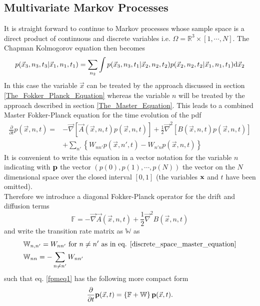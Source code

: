 \subsection{Multivariate Markov Processes}
\label{Multivariate_Markov_Processes}
It is straight forward to continue to Markov processes whose sample space is a direct product of continuous and discrete variables i.e. $\Omega = \mathbb{R}^{3} \times [1,\cdots, N]$. The Chapman Kolmogorov equation then becomes
\begin{equation}
    p(\vec{x}_3,n_3,t_3|\vec{x}_1,n_1,t_1) = \sum_{n_2} \int p(\vec{x}_3,n_3,t_1|\vec{x}_2,n_2,t_2)p(\vec{x}_2,n_2,t_2|\vec{x}_1,n_1,t_1) {\rm d} \vec{x}_2
    \label{MCK}
\end{equation}
In this case the variable $\vec{x}$ can be treated by the approach discussed in section \ref{The_Fokker_Planck_Equation} whereas the variable $n$ will be treated by the approach described in section \ref{The_Master_Equation}. This leads to a combined Master Fokker-Planck equation for the time evolution of the pdf
\begin{align}
    \frac{\partial}{\partial t } p(\vec{x},n,t) =   &- \vec{ \nabla } \left[\vec{A}(\vec{x},n,t)p(\vec{x},n,t) \right] + \frac{1}{2}\vec{\nabla}^{2}\left[ B(\vec{x},n,t)p(\vec{x},n,t) \right] \nonumber \\
                                                    &+ \sum_{n'} \left\{ W_{nn'}p(\vec{x},n',t) - W_{n'n}p(\vec{x},n,t)\right\}
    \label{fpmeq1}
\end{align}
It is convenient to write this equation in a vector notation for the variable $n$ indicating with $\boldsymbol{\mathbf{p}}$ the vector $(p(0),p(1),\cdots,p(N))$ the vector on the $N$ dimensional space over the closed interval $[0,1]$ (the variables $\boldsymbol{\mathbf{x}}$ and $t$ have been omitted). \\ 
Therefore we introduce a diagonal Fokker-Planck operator for the drift and diffusion terms
\begin{equation}
    \mathbb{F} = - \vec{ \nabla } \vec{A}(\vec{x},n,t) + \frac{1}{2}\vec{\nabla}^{2} B(\vec{x},n,t)
    \label{fpo}
\end{equation}
and write the transition rate matrix as $\mathbb{W}$ as
\begin{align*}
    &\mathbb{W}_{n,n'} = W_{nn'} \mbox{ for } n \ne n' \mbox{ as in eq. \eqref{discrete_space_master_equation}} \\
    &\mathbb{W}_{nn} = -\sum_{n \ne n'}W_{nn'}
\end{align*}
such that eq. \eqref{fpmeq1} has the following more compact form
\begin{equation}
    \frac{\partial}{\partial t} \boldsymbol{\mathbf{p}}(\vec{x},t) = \left\{ \mathbb{F} + \mathbb{W} \right\} \boldsymbol{\mathbf{p}}(\vec{x},t).
    \label{fpmeq2}
\end{equation}

